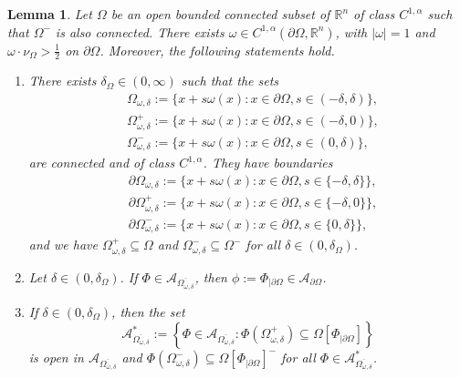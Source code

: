 \documentclass[11pt,reqno,a4paper]{amsart}
\theoremstyle{plain}
\newtheorem{lemma}[theorem]{Lemma}
\theoremstyle{definition}
\newcommand{\R}{\mathbb{R}}
\begin{document}
\begin{lemma}\label{lemma Omega tub}
    Let $\Omega$ be an open bounded connected subset of $\R^n$ of class $C^{1,\alpha}$ such that $\Omega^-$ is also connected. There exists $\omega \in C^{1,\alpha}(\partial\Omega, \R^n)$, with $|\omega|=1$ and $\omega \cdot \nu_\Omega > \frac{1}{2}$ on $\partial\Omega$. Moreover, the following statements hold.
    \begin{enumerate}
        \item[(i)] There exists $\delta_{\Omega} \in (0,\infty)$ such that the sets
        \begin{equation}\label{eq: Omega omega delta}
        \begin{aligned}
            &\Omega_{\omega,\delta} := \{ x+s\omega(x) \colon x \in \partial\Omega, s \in (-\delta,\delta)\},
            \\
            &\Omega^+_{\omega,\delta} := \{ x+s\omega(x) \colon x \in \partial\Omega, s \in (-\delta,0)\},
            \\
            &\Omega^-_{\omega,\delta} := \{ x+s\omega(x) \colon x \in \partial\Omega, s \in (0,\delta)\},
        \end{aligned}
        \end{equation}
        are connected and of class $C^{1,\alpha}$. They have boundaries
        \begin{align*}
            &\partial\Omega_{\omega,\delta} := \{ x+s\omega(x) \colon x \in \partial\Omega, s \in \{-\delta,\delta\} \},
            \\
            &\partial\Omega^+_{\omega,\delta} := \{ x+s\omega(x) \colon x \in \partial\Omega, s \in \{-\delta,0\} \},
            \\
            &\partial\Omega^-_{\omega,\delta} := \{ x+s\omega(x) \colon x \in \partial\Omega, s \in \{0,\delta\} \},
        \end{align*}
        and we have $\Omega^+_{\omega,\delta} \subseteq \Omega$ and $\Omega^-_{\omega,\delta} \subseteq \Omega^-$ for all $\delta \in (0,\delta_{\Omega})$.
        
        \item[(ii)] Let $\delta \in (0,\delta_{\Omega})$. If $\Phi \in \mathcal{A}_{\overline{\Omega_{\omega,\delta}}}$, then $\phi := \Phi_{|\partial\Omega} \in \mathcal{A}_{\partial\Omega}$.

        \item[(iii)] If $\delta \in (0,\delta_{\Omega})$, then the set 
        \begin{equation*}
            \mathcal{A}^*_{\overline{\Omega_{\omega,\delta}}} := \left\{ \Phi \in \mathcal{A}_{\overline{\Omega_{\omega,\delta}}} \colon \Phi(\Omega^+_{\omega,\delta}) \subseteq \Omega[\Phi_{|\partial\Omega} ] \right\}
        \end{equation*}
        is open in $\mathcal{A}_{\overline{\Omega_{\omega,\delta}}}$ and $\Phi(\Omega^-_{\omega,\delta}) \subseteq \Omega[\Phi_{|\partial\Omega}]^-$ for all $\Phi \in \mathcal{A}^*_{\overline{\Omega_{\omega,\delta}}}$.


\end{enumerate}
\end{lemma}
\end{document}

